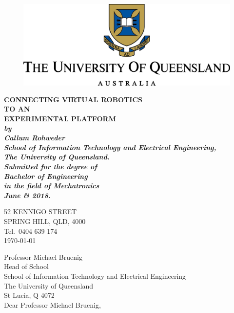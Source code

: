 \documentclass[12pt,openany,a4paper]{book}
\renewcommand{\baselinestretch}{1.2}	%
\begin{document}
\frontmatter

\begin{titlepage}
\renewcommand{\baselinestretch}{1.0}

\begin{center}

\begin{figure}
  \includegraphics[width=\linewidth]{UQLogo.png}
\end{figure}

\vspace*{12mm}
\Huge\bf
		CONNECTING VIRTUAL ROBOTICS\\
		TO AN\\
		EXPERIMENTAL PLATFORM\\
\vspace{20mm}
\large\sl
		by\\
		Callum Rohweder
		\medskip\\
\rm
		School of Information Technology and Electrical Engineering,\\
		The University of Queensland.\\
\vspace{30mm}
		Submitted for the degree of\\
		Bachelor of Engineering
		\smallskip\\
\normalsize
		in the field of Mechatronics
		\medskip\\
\large
		June \& 2018.		
\end{center}
\end{titlepage}

\cleardoublepage

\begin{flushright}
	52 KENNIGO STREET\\
	SPRING HILL, QLD, 4000\\
	Tel.\ 0404 639 174\\
	\medskip
	\today
\end{flushright}
\begin{flushleft}
  Professor Michael Bruenig\\
  Head of School\\
  School of Information Technology and Electrical Engineering\\
  The University of Queensland\\
  St Lucia, Q 4072\\
  \bigskip\bigskip
  Dear Professor Michael Bruenig,
\end{flushleft}
\end{document}
